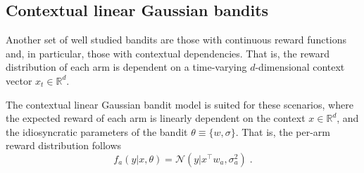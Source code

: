 \documentclass{article}
\def \Real{{\mathbb R}}
\newcommand{\N}[1]{\mathcal{N}\left( #1\right)}
\begin{document}
\subsection{Contextual linear Gaussian bandits}
\label{ssec:contextLinearGaussian_bandits}

Another set of well studied bandits are those with continuous reward functions and, in particular, those with contextual dependencies. That is, the reward distribution of each arm is dependent on a time-varying $d$-dimensional context vector $x_t\in\Real^{d}$.

The contextual linear Gaussian bandit model is suited for these scenarios, where the expected reward of each arm is linearly dependent on the context $x\in\Real^{d}$, and the idiosyncratic parameters of the bandit $\theta\equiv\{w, \sigma\}$. That is, the per-arm reward distribution follows
\begin{equation}
f_a(y|x,\theta)=\N{y|x^\top w_a, \sigma_a^2} \; .
\end{equation}
\end{document}
